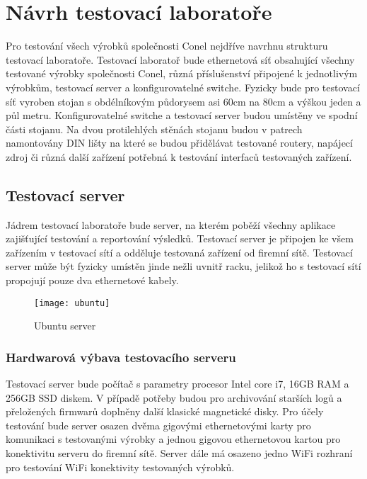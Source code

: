 \chapter{Návrh testovací laboratoře}
Pro testování všech výrobků společnosti Conel nejdříve navrhnu strukturu testovací laboratoře. Testovací laboratoř bude ethernetová síť obsahující všechny testované výrobky společnosti Conel, různá příslušenství připojené k jednotlivým výrobkům, testovací server a konfigurovatelné switche. Fyzicky bude pro testovací síť vyroben stojan s obdélníkovým půdorysem asi 60cm na 80cm a výškou jeden a půl metru. Konfigurovatelné switche a testovací server budou umístěny ve spodní části stojanu. Na dvou protilehlých stěnách stojanu budou v patrech namontovány DIN lišty na které se budou přidělávat testované routery, napájecí zdroj či různá další zařízení potřebná k testování interfaců testovaných zařízení.

\section{Testovací server}
Jádrem testovací laboratoře bude server, na kterém poběží všechny aplikace zajišťující testování a reportování výsledků. Testovací server je připojen ke všem zařízením v testovací sítí a odděluje testovaná zařízení od firemní sítě. Testovací server může být fyzicky umístěn jinde nežli uvnitř racku, jelikož ho s testovací sítí propojují pouze dva ethernetové kabely.

\begin{figure}[h]
  \centering
  \texttt{[image: ubuntu]}
  \caption{Ubuntu server}
  \label{fig:ubuntu}
\end{figure}

\subsection{Hardwarová výbava testovacího serveru}
Testovací server bude počítač s parametry procesor Intel core i7, 16GB RAM a 256GB SSD diskem. V případě potřeby budou pro archivování starších logů a přeložených firmwarů doplněny další klasické magnetické disky. Pro účely testování bude server osazen dvěma gigovými ethernetovými karty pro komunikaci s testovanými výrobky a jednou gigovou ethernetovou kartou pro konektivitu serveru do firemní sítě. Server dále má osazeno jedno WiFi rozhraní pro testování WiFi konektivity testovaných výrobků.

